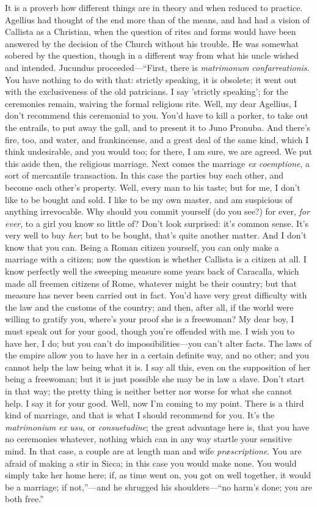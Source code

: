 It is a proverb how different things are in theory and when reduced
to practice. Agellius had thought of the end more than of the means,
and had had a vision of Callista as a Christian, when the question of
rites and forms would have been answered by the decision of the Church
without his trouble. He was somewhat sobered by the question, though
in a different way from what his uncle wished and intended. Jucundus
proceeded—``First, there is \emph{matrimonum confarreationis}.
You have nothing to do with that: strictly speaking, it is
obsolete; it went out with the exclusiveness of the old patricians. I
say 'strictly speaking'; for the ceremonies remain, waiving the formal
religious rite. Well, my dear Agellius, I don't recommend this
ceremonial to you. You'd have to kill a porker, to take out the
entrails, to put away the gall, and to present it to Juno Pronuba. And
there's fire, too, and water, and frankincense, and a great deal of
the same kind, which I think undesirable, and you would too; for
there, I am sure, we are agreed. We put this aside then, the religious
marriage. Next comes the marriage \emph{ex coemptione}, a sort of
mercantile transaction. In this case the parties buy each other, and
become each other's property. Well, every man to his taste; but for
me, I don't like to be bought and sold. I like to be my own master,
and am suspicious of anything irrevocable. Why should you commit
yourself (do you see?) for ever, \emph{for ever}, to a girl you know
so little of? Don't look surprised: it's common sense. It's very well
to buy \emph{her}; but to be bought, that's quite another matter. And
I don't know that you can. Being a Roman citizen yourself, you can
only make a marriage with a citizen; now the question is whether
Callista is a citizen at all. I know perfectly well the sweeping
measure some years back of Caracalla, which made all freemen citizens
of Rome, whatever might be their country; but that measure has never
been carried out in fact. You'd have very great difficulty with the
law and the customs of the country; and then, after all, if the
world were willing to gratify you, where's your proof she is a
freewoman? My dear boy, I must speak out for your good, though you're
offended with me. I wish you to have her, I do; but you can't do
impossibilities—you can't alter facts. The laws of the empire allow
you to have her in a certain definite way, and no other; and you
cannot help the law being what it is. I say all this, even on the
supposition of her being a freewoman; but it is just possible she may
be in law a slave. Don't start in that way; the pretty thing is
neither better nor worse for what she cannot help. I say it for your
good. Well, now I'm coming to my point. There is a third kind of
marriage, and that is what I should recommend for you. It's the \emph{matrimonium
ex usu}, or \emph{consuetudine}; the great advantage here is, that
you have no ceremonies whatever, nothing which can in any way startle
your sensitive mind. In that case, a couple are at length man and wife
\emph{præscriptione}. You are afraid of making a stir in Sicca; in
this case you would make none. You would simply take her home here;
if, as time went on, you got on well together, it would be a marriage;
if not,''—and he shrugged his shoulders—``no harm's done;
you are both free.''

